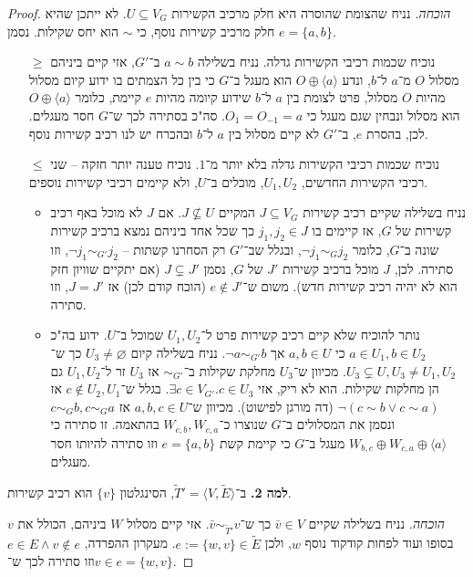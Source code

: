 \documentclass[]{article}
\newcommand\ra    {\rangle}
\newcommand\la    {\langle}
\newcommand\tl    {\tilde}
\begin{document}
\begin{proof}
		\textit{הוכחה. }נניח שהצומת שהוסרה היא חלק מרכיב הקשירות $U \subseteq V_G$. לא ייתכן שהיא חלק מרכיב קשירות נוסף, כי $\sim$ הוא יחס שקילות. נסמן $e = \{a, b\}$. 
		\begin{itemize}
			\item[$\ge$] נוכיח שכמות רכיבי הקשירות גדלה. נניח בשלילה $a \sim b$ ב־$G'$, אזי קיים ביניהם מסלול $O$ מ־$a$  ל־$b$, ונדע $O \oplus \la a \ra$ הוא מעגל ב־$G$ כי בין כל הצמתים בו ידוע קיום מסלול מהיות $O$ מסלול, פרט לצומת בין $a$ ל־$b$ שידוע קיומה מהיות $e$ קיימת, כלומר $O \oplus \la a \ra$ הוא מסלול ונבחין שגם מעגל כי $O_1 = O_{-1} = a$. סה"כ בסתירה לכך ש־$G$ חסר מעגלים. לכן, בהסרת $e$, ב־$G'$ לא קיים מסלול בין $a$ ל־$b$ ובהכרח יש לנו רכיב קשירות נוסף. 
			\item[$\le$] נוכיח שכמות רכיבי הקשירות גדלה בלא יותר מ־$1$. נוכיח טענה יותר חזקה – שני רכיבי הקשירות החדשים, $U_1, U_2$, מוכלים ב־$U$, ולא קיימים רכיבי קשירות נוספים. 
			\begin{itemize}
				\item נניח בשלילה שקיים רכיב קשירות $J \subseteq V_{G}$ המקיים $J \nsubseteq U$. אם $J$ לא מוכל באף רכיב קשירות של $G$, אז קיימים בו $j_1, j_2 \in J$ כך שכל אחד ביניהם נמצא ברכיב קשירות שונה ב־$G$, כלומר $\lnot j_1 \sim_{G} j_2$, ובגלל שב־$G'$ רק הסחרנו קשתות – $\lnot j_1 \sim_{G'} j_2$, וזו סתירה. לכן, $J$ מוכל ברכיב קשירות $J'$ של $G$, נסמן $J \subsetneq J'$ (אם יתקיים שוויון חזק הוא לא יהיה רכיב קשירות חדש). משום ש־$e \notin J'$ (הוכח קודם לכן) אז $J = J'$, וזו סתירה.
				\item נותר להוכיח שלא קיים רכיב קשירות פרט ל־$U_1, U_2$ שמוכל ב־$U$. ידוע בה"כ $a \in U_1, b \in U_2$ כי $a, b \in U$ אך $\lnot a \sim_{G'} b$. נניח בשלילה קיום $U_3 \neq \varnothing$ כך ש־$U_3 \subsetneq U, U_3 \neq U_1, U_2$. מכיוון ש־$U_3$ מחלקת שקילות ב־$\sim_{G'}$ אז $U_3$ זר ל־$U_1, U_2$ גם הן מחלקות שקילות. הוא לא ריק, אזי $\exists c \in V_{G'}. c \in U_3$. בגלל ש־$c \notin U_2, U_1$ אז $\lnot (c \sim b \lor c \sim a)$ (דה מורגן לפישוט). מכיוון ש־$a, b, c \in U$ אז $c \sim_{G} b, c \sim_G a$ ונסמן את המסלולים ב־$G$ שנוצרו כ־$W_{c, b}, W_{c, a}$ בהתאמה. זו סתירה כי $W_{b, c} \oplus W_{c, a} \oplus \la a \ra$ מעגל ב־$G$ כי קיימת קשת $e = \{a, b\}$ וזו סתירה להיותו חסר מעגלים. 
			\end{itemize}
		\end{itemize}
		\textbf{למה 2. }ב־$\tl T' = \la V, \tl E \ra$, הסינגלטון $\{v\}$ הוא רכיב קשירות. 
		
		\textit{הוכחה. }נניח בשלילה שקיים $\bar v \in V$ כך ש־$\bar v \sim_{\tl T'} v$. אזי קיים מסלול $W$ ביניהם, הכולל את $v$ בסופו ועוד לפחות קודקוד נוסף $w$, ולכן $e := \{w, v\} \in \tl E$. מעקרון ההפרדה, $e \in E \land v \notin e$ וזו סתירה לכך ש־$v \in e = \{w, v\}$. 
		

\end{proof}
\end{document}
